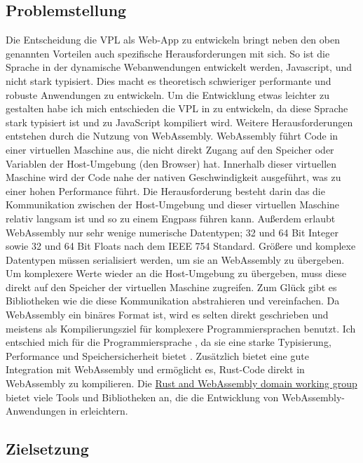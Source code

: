\documentclass[ngerman]{article}
\begin{document}
\subsection{Problemstellung}

Die Entscheidung die VPL als Web-App zu entwickeln bringt neben den oben genannten Vorteilen auch spezifische Herausforderungen mit sich.
So ist die Sprache in der dynamische Webanwendungen entwickelt werden, Javascript,  und nicht stark typisiert. 
Dies macht es theoretisch schwieriger performante und robuste Anwendungen zu entwickeln. 
Um die Entwicklung etwas leichter zu gestalten habe ich mich entschieden die VPL in  zu entwickeln, da diese Sprache stark typisiert ist und zu JavaScript kompiliert wird.
\br
Weitere Herausforderungen entstehen durch die Nutzung von WebAssembly. 
WebAssembly führt Code in einer virtuellen Maschine aus, die nicht direkt Zugang auf den Speicher oder Variablen der Host-Umgebung (den Browser) hat.
Innerhalb dieser virtuellen Maschine wird der Code nahe der nativen Geschwindigkeit ausgeführt, was zu einer hohen Performance führt. 
Die Herausforderung besteht darin das die Kommunikation zwischen der Host-Umgebung und dieser virtuellen Maschine relativ langsam ist und so zu einem Engpass führen kann.
\br
Außerdem erlaubt WebAssembly nur sehr wenige numerische Datentypen; 32 und 64 Bit Integer sowie 32 und 64 Bit Floats nach dem IEEE 754 Standard. 
Größere und komplexe Datentypen müssen serialisiert werden, um sie an WebAssembly zu übergeben. 
Um komplexere Werte wieder an die Host-Umgebung zu übergeben, muss diese direkt auf den Speicher der virtuellen Maschine zugreifen.
Zum Glück gibt es Bibliotheken wie  die diese Kommunikation abstrahieren und vereinfachen.
\br
Da WebAssembly ein binäres Format ist, wird es selten direkt geschrieben und meistens als Kompilierungsziel für komplexere Programmiersprachen benutzt.
Ich entschied mich für die Programmiersprache , da sie eine starke Typisierung, Performance und Speichersicherheit bietet \cite{bugden2022rust}.
Zusätzlich bietet  eine gute Integration mit WebAssembly und ermöglicht es, Rust-Code direkt in WebAssembly zu kompilieren. 
Die \href{https://rustwasm.github.io/}{Rust and WebAssembly domain working group} bietet viele Tools und Bibliotheken an, die die Entwicklung von WebAssembly-Anwendungen in  erleichtern.

\subsection{Zielsetzung} 
\label{sec:Zielsetzung}
\end{document}
